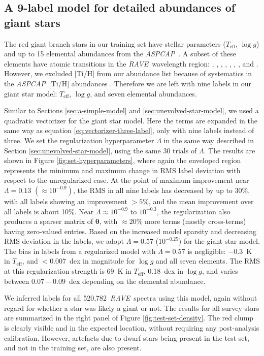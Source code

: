\documentclass[preprint,trackchanges]{aastex}
\newcommand{\acronym}[1]{{\small{#1}}}
\newcommand{\project}[1]{\textsl{#1}}
\newcommand{\rave}{\project{\acronym{RAVE}}}
\newcommand{\aspcap}{\project{\acronym{ASPCAP}}}
\newcommand{\teff}{T_{\mathrm{eff}}}
\newcommand{\logg}{\log g}
\newcommand{\Nspectra}{520,782}
\newcommand{\Dvector}[1]{\boldsymbol{#1}}
\newcommand{\vectheta}{\Dvector{\theta}}
\begin{document}
\subsection{A 9-label model for detailed abundances of giant stars}
\label{sec:evolved-star-model}


The red giant branch stars in our training set have stellar parameters 
($\teff$, $\logg$) and up to 15 elemental abundances from the \aspcap\ 
\citep{Garcia_Perez_2016}.  A subset of these elements have atomic transitions in the 
\rave\ wavelength region: \ion{O}{1}, \ion{Mg}{1}, \ion{Al}{1}, \ion{Si}{1}, 
\ion{Ca}{2}, \ion{Ti}{1}, \ion{Fe}{1}, and \ion{Ni}{1}.  However, we 
excluded [Ti/H] from our abundance list because of systematics in the \aspcap\
[Ti/H] abundances \citep{Holtzman_2015,Hawkins_2016}.  Therefore we are left 
with nine labels in our giant star model: $\teff$, $\logg$, and seven elemental 
abundances.  


Similar to Sections \ref{sec:a-simple-model} and \ref{sec:unevolved-star-model},
we used a quadratic vectorizer for the giant star model.  Here the terms are 
expanded in the same way as equation \ref{eq:vectorizer-three-label}, only
with nine labels instead of three.  We set the regularization hyperparameter $\Lambda$
in the same way described in Section \ref{sec:unevolved-star-model}, using the same 30 trials of $\Lambda$.
The results are shown in Figure \ref{fig:set-hyperparameters}, where
again the enveloped region represents the minimum and maximum change in RMS label
deviation with respect to the unregularized case.  At the point of maximum improvement 
near $\Lambda = 0.13$ $(\approx10^{-0.9})$, the RMS in all nine labels has decreased by up to $30$\%,
with all labels showing an improvement $>5$\%, and the mean improvement over all labels is about 10\%.
Near $\Lambda \approx 10^{-0.9}$ to $10^{-0.3}$, the regularization also produces a sparser matrix
of $\vectheta$, with $\approx20$\% more terms (mostly cross-terms) having zero-valued entries.
Based on the increased model sparsity and decreasing RMS deviation in the labels, 
we adopt $\Lambda = 0.57$ ($10^{-0.25}$) for the giant star model.  The bias in 
labels from a regularized model with $\Lambda = 0.57$ is negligible: $-0.3$~K in 
$\teff$, and $<$0.007~dex in magnitude for $\logg$ and all seven elements.  The RMS
at this regularization strength is 69~K in $\teff$, 0.18~dex in $\logg$, and varies
between $0.07-0.09$~dex depending on the elemental abundance.  


We inferred labels for all \Nspectra\ \rave\ spectra using this model, again without
regard for whether a star was likely a giant or not.  The results for all survey stars
are summarized in the right panel of Figure \ref{fig:test-set-density}.  The red clump
is clearly visible and in the expected location, without requiring any post-analysis 
calibration.  However, artefacts due to dwarf stars being present in the test set,
and not in the training set, are also present.
\end{document}
